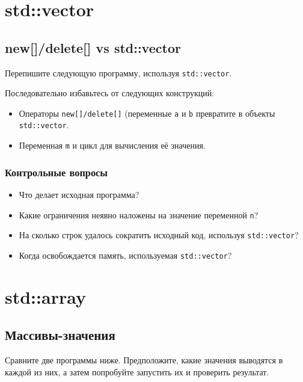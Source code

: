 \documentclass[10pt,twoside,openany]{book}
\begin{document}



\tableofcontents

\clearpage

\chapter{std::vector}

\section{new[]/delete[] vs std::vector}

Перепишите следующую программу, используя {\tt std::vector}.

Последовательно избавьтесь от следующих конструкций:
\begin{itemize}
    \item Операторы {\tt new[]/delete[]} (переменные {\tt a} и {\tt b}
          превратите в объекты {\tt std::vector}.
    \item Переменная {\tt m} и цикл для вычисления её значения.
\end{itemize}



\subsection*{Контрольные вопросы}

\begin{itemize}
    \item Что делает исходная программа?
    \item Какие ограничения неявно наложены на значение переменной {\tt n}?
    \item На сколько строк удалось сократить исходный код, используя {\tt std::vector}?
    \item Когда освобождается память, используемая {\tt std::vector}?
\end{itemize}

\chapter{std::array}

\section{Массивы-значения}
\label{array-value}

Сравните две программы ниже. Предположите, какие значения выводятся в каждой из них,
а затем попробуйте запустить их и проверить результат.
\end{document}
